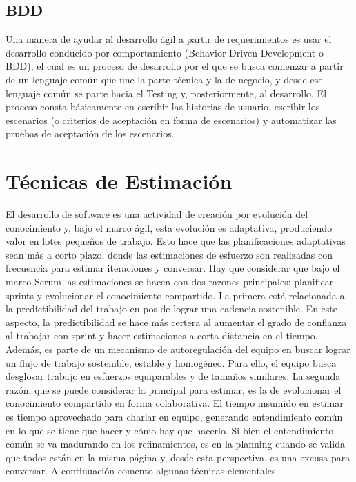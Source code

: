 \subsection{BDD}

Una manera de ayudar al desarrollo ágil a partir de requerimientos es usar el desarrollo conducido por comportamiento (Behavior Driven Development o BDD), el cual es un proceso de desarrollo por el que se busca comenzar a partir de un lenguaje común que une la parte técnica y la de negocio, y desde ese lenguaje común se parte hacia el Testing y, posteriormente, al desarrollo. El proceso consta básicamente en escribir las historias de usuario, escribir los escenarios (o criterios de aceptación en forma de escenarios) y automatizar las pruebas de aceptación de los escenarios.


\section{Técnicas de Estimación}

El desarrollo de software es una actividad de creación por evolución del conocimiento y, bajo el marco ágil, esta evolución es adaptativa, produciendo valor en lotes pequeños de trabajo. Esto hace que las planificaciones adaptativas sean más a corto plazo, donde las estimaciones de esfuerzo son realizadas con frecuencia para estimar iteraciones y conversar. Hay que considerar que bajo el marco Scrum las estimaciones se hacen con dos razones principales: planificar sprints y evolucionar el conocimiento compartido. La primera está relacionada a la predictibilidad del trabajo en pos de lograr una cadencia sostenible. En este aspecto, la predictibilidad se hace más certera al aumentar el grado de confianza al trabajar con sprint y hacer estimaciones a corta distancia en el tiempo. Además, es parte de un mecanismo de autoregulación del equipo en buscar lograr un flujo de trabajo sostenible, estable y homogéneo. Para ello, el equipo busca desglosar trabajo en esfuerzos equiparables y de tamaños similares. La segunda razón, que se puede considerar la principal para estimar, es la de evolucionar el conocimiento compartido en forma colaborativa. El tiempo insumido en estimar es tiempo aprovechado para charlar en equipo, generando entendimiento común en lo que se tiene que hacer y cómo hay que hacerlo. Si bien el entendimiento común se va madurando en los refinamientos, es en la planning cuando se valida que todos están en la misma página y, desde esta perspectiva, es una excusa para conversar. A continuación comento algunas técnicas elementales.

